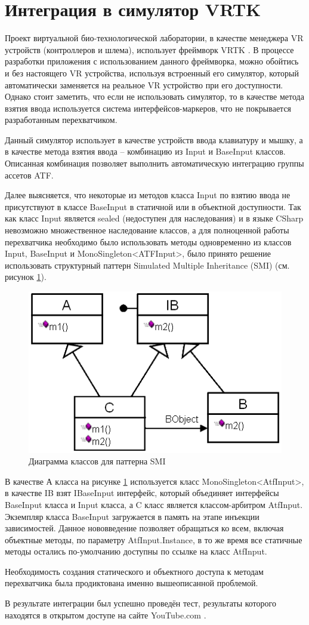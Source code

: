 \section{Интеграция в симулятор VRTK}
Проект виртуальной био-технологической лаборатории, в качестве менеджера VR устройств (контроллеров и шлема), использует фреймворк VRTK \cite{vrtk}. В процессе разработки приложения с использованием данного фреймворка, можно обойтись и без настоящего VR устройства, используя встроенный его симулятор, который автоматически заменяется на реальное VR устройство при его доступности. Однако стоит заметить, что если не использовать симулятор, то в качестве метода взятия ввода используется система интерфейсов-маркеров, что не покрывается разработанным перехватчиком.

Данный симулятор использует в качестве устройств ввода клавиатуру и мышку, а в качестве метода взятия ввода -- комбинацию из Input и BaseInput классов. Описанная комбинация позволяет выполнить автоматическую интеграцию группы ассетов ATF. 

Далее выясняется, что некоторые из методов класса Input по взятию ввода не присутствуют в классе BaseInput в статичной или в объектной доступности. Так как класс Input является sealed (недоступен для наследования) и в языке CSharp невозможно множественное наследование классов, а для полноценной работы перехватчика необходимо было использовать методы одновременно из классов Input, BaseInput и MonoSingleton<ATFInput>, было принято решение использовать структурный паттерн Simulated Multiple Inheritance (SMI) (см. рисунок \ref{smi_diagram}).

\begin{figure}[H]
	\centering
	\includegraphics[width=0.6\linewidth]{multiinheritance.png}
	\caption{Диаграмма классов для паттерна SMI}
	\label{smi_diagram}
\end{figure}

В качестве А класса на рисунке \ref{smi_diagram} используется класс MonoSingleton<AtfInput>, в качестве IB взят IBaseInput интерфейс, который объединяет интерфейсы BaseInput класса и Input класса, а C класс является классом-арбитром AtfInput. Экземпляр класса BaseInput загружается в память на этапе инъекции зависимостей. Данное нововведение позволяет обращаться ко всем, включая объектные методы, по параметру AtfInput.Instance, в то же время все статичные методы остались по-умолчанию доступны по ссылке на класс AtfInput.

Необходимость создания статического и объектного доступа к методам перехватчика была продиктована именно вышеописанной проблемой.

В результате интеграции был успешно проведён тест, результаты которого находятся в открытом доступе на сайте YouTube.com \cite{video}.